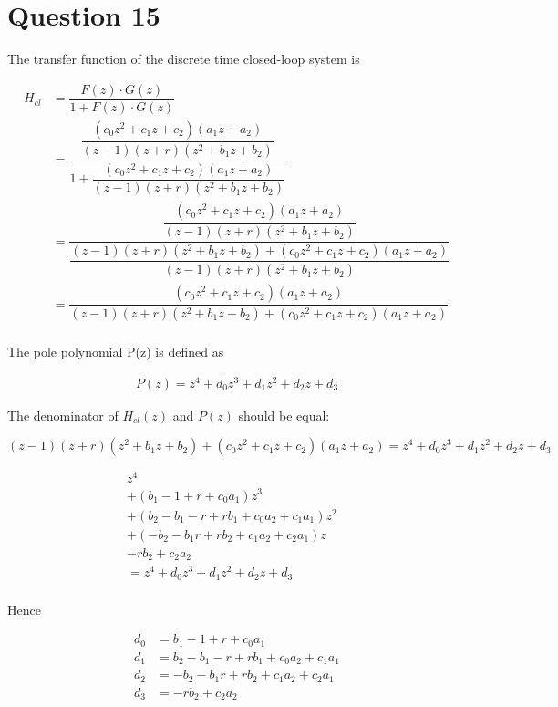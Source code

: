 \section{Question 15}

The transfer function of the discrete time closed-loop system is

\begin{align*}
  H_{cl} &= \dfrac{F(z)\cdot G(z)}{1 + F(z)\cdot G(z)} \\
         &= \dfrac{\dfrac{(c_0z^2 + c_1z +c_2)(a_1z + a_2)}{(z-1)(z+r)(z^2 + b_1z + b_2)}}
            {1 + \dfrac{(c_0z^2 + c_1z +c_2)(a_1z + a_2)}{(z-1)(z+r)(z^2 + b_1z + b_2)}} \\
         &= \dfrac{\dfrac{(c_0z^2 + c_1z +c_2)(a_1z + a_2)}{(z-1)(z+r)(z^2 + b_1z + b_2)}}
            {\dfrac{(z-1)(z+r)(z^2 + b_1z + b_2) + (c_0z^2 + c_1z +c_2)(a_1z + a_2)}{(z-1)(z+r)(z^2 + b_1z + b_2)}}\\
         &= \dfrac{(c_0z^2 + c_1z +c_2)(a_1z + a_2)}{(z-1)(z+r)(z^2 + b_1z + b_2) + (c_0z^2 + c_1z +c_2)(a_1z + a_2)}\\
\end{align*}

The pole polynomial P(z) is defined as

\begin{align*}
  P(z) = z^4 + d_0z^3 + d_1z^2 + d_2z + d_3
\end{align*}

The denominator of $H_{cl}(z)$ and $P(z)$ should be equal:

\begin{equation*}
  (z-1)(z+r)(z^2 + b_1z + b_2) + (c_0z^2 + c_1z +c_2)(a_1z + a_2) = z^4 + d_0z^3 + d_1z^2 + d_2z + d_3
\end{equation*}

\begin{align*}
  z^4 &\\
    + (b_1 - 1 + r + c_0a_1)z^3 &\\
    + (b_2 - b_1 -r + rb_1 +c_0a_2 + c_1a_1)z^2 &\\
    + (-b_2 - b_1r + rb_2 + c_1a_2 + c_2a_1)z &\\
    - rb_2 + c_2a_2 &\\
    =  z^4 + d_0z^3 + d_1z^2 + d_2z + d_3\\
\end{align*}

Hence

\begin{align*}
    d_0 &= b_1 - 1 + r + c_0a_1 \\
    d_1 &= b_2 - b_1 -r + rb_1 +c_0a_2 + c_1a_1 \\
    d_2 &= -b_2 - b_1r + rb_2 + c_1a_2 + c_2a_1 \\
    d_3 &= - rb_2 + c_2a_2 \\
\end{align*}

